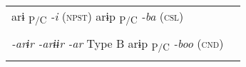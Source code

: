 \begin{table}
\begin{tabular}{ll}
                                                                                                                                                                                                                                                                                                                                                                                                                                                                                                                                \\
arɨ\textsubscript{ P/C}      \textit{-i} (\textsc{npst})    arɨp\textsubscript{ P/C}      \textit{-ba} (\textsc{csl})                                                                                                                                                                                                                                                                                                                                                                                                           \\
                                                                                                                                                                                                                                                                                                                                                                                                                                                                                                                                \\
\textit{-arɨr  -arɨɨr  -ar} Type B    arɨp\textsubscript{ P/C}      \textit{-boo} (\textsc{cnd})                                                                                                                                                                                                                                                                                                                                                                                                                                \\
                                                                                                                                                                                                                                                                                                                                                                                                                                                                                                                                \\

\end{tabular}
\end{table}
